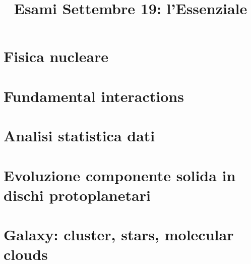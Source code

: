 \documentclass[oneside,20pt,fleqn,extrafontsizes]{memoir}
\title{Esami Settembre 19: l'Essenziale}
\begin{document}
\pagestyle{mystyle}%
\renewcommand*{\contentsname}{\label{toc}{Table of Contents}}%
\maketitle
\startcontents[chapters]

\tableofcontents*

\part{Fisica nucleare}

%

\part{Fundamental interactions}\label{intfon}




\part{Analisi statistica dati}\label{asd}




\part{Evoluzione componente solida in dischi protoplanetari}\label{ppd}


\part{Galaxy: cluster, stars, molecular clouds}\label{stars}


\stopcontents[chapters]
\end{document}
